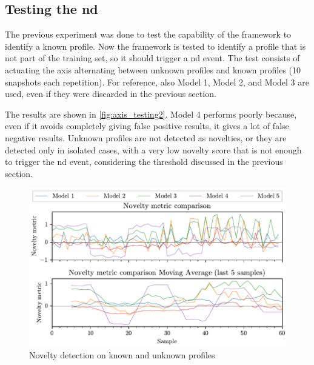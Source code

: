 \subsection{Testing the \gls{nd}}
The previous experiment was done to test the capability of the framework to identify a known profile. Now the framework is tested to identify a profile that is not part of the training set, so it should trigger a \gls{nd} event. The test consists of actuating the axis alternating between unknown profiles and known profiles (10 snapshots each repetition). For reference, also Model 1, Model 2, and Model 3 are used, even if they were discarded in the previous section. 

The results are shown in \autoref{fig:axis_testing2}. Model 4 performs poorly because, even if it avoids completely giving false positive results, it gives a lot of false negative results. Unknown profiles are not detected as novelties, or they are detected only in isolated cases, with a very low novelty score that is not enough to trigger the \gls{nd} event, considering the threshold discussed in the previous section.

\begin{figure}
    \centering
    \includegraphics{images/LinearMotor/Testing2.pdf}
    \caption{Novelty detection on known and unknown profiles}
    \label{fig:axis_testing2}
\end{figure}